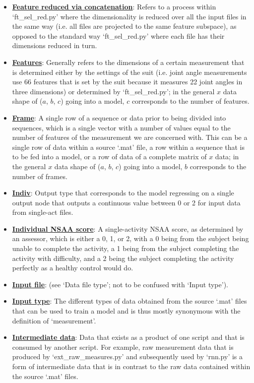 \documentclass[12pt,twoside]{report}
\begin{document}
\begin{itemize}
	\item \underline{\textbf{Feature reduced via concatenation}}: Refers to a process within ‘ft\_sel\_red.py’ where the dimensionality is reduced over all the input files in the same way (i.e. all files are projected to the same feature subspace), as opposed to the standard way ‘ft\_sel\_red.py’ where each file has their dimensions reduced in turn.
 	\item \underline{\textbf{Features}}: Generally refers to the dimensions of a certain measurement that is determined either by the settings of the suit (i.e. joint angle measurements use 66 features that is set by the suit because it measures 22 joint angles in three dimensions) or determined by ‘ft\_sel\_red.py’; in the general $x$ data shape of ($a$, $b$, $c$) going into a model, $c$ corresponds to the number of features.
	\item \underline{\textbf{Frame}}: A single row of a sequence or data prior to being divided into sequences, which is a single vector with a number of values equal to the number of features of the measurement we are concerned with. This can be a single row of data within a source ‘.mat’ file, a row within a sequence that is to be fed into a model, or a row of data of a complete matrix of $x$ data; in the general $x$ data shape of ($a$, $b$, $c$) going into a model, $b$ corresponds to the number of frames.
	\item \underline{\textbf{Indiv}}: Output type that corresponds to the model regressing on a single output node that outputs a continuous value between 0 or 2 for input data from single-act files.
	\item \underline{\textbf{Individual NSAA score}}: A single-activity NSAA score, as determined by an assessor, which is either a 0, 1, or 2, with a 0 being from the subject being unable to complete the activity, a 1 being from the subject completing the activity with difficulty, and a 2 being the subject completing the activity perfectly as a healthy control would do.
	\item \underline{\textbf{Input file}}: (see ‘Data file type’; not to be confused with ‘Input type’).
	\item \underline{\textbf{Input type}}: The different types of data obtained from the source ‘.mat’ files that can be used to train a model and is thus mostly synonymous with the definition of ‘measurement’.
	\item \underline{\textbf{Intermediate data}}: Data that exists as a product of one script and that is consumed by another script. For example, raw measurement data that is produced by ‘ext\_raw\_measures.py’ and subsequently used by ‘rnn.py’ is a form of intermediate data that is in contrast to the raw data contained within the source ‘.mat’ files.

\end{itemize}
\end{document}
